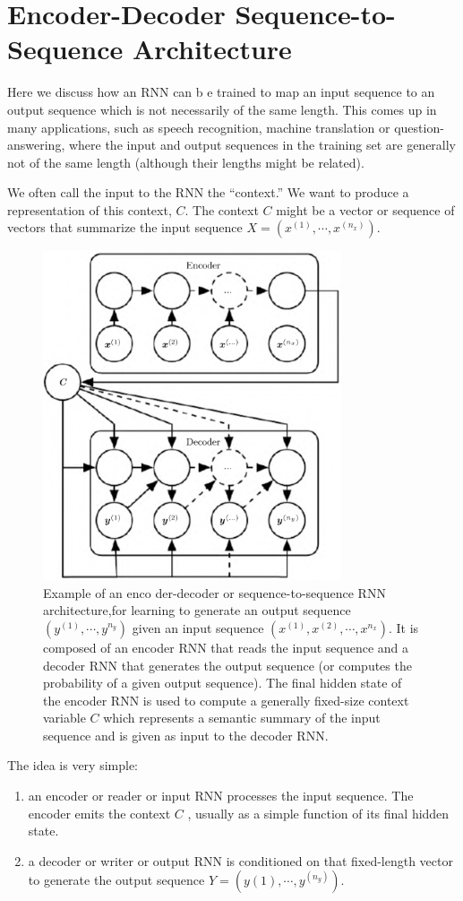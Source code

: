 \documentclass{report}
\begin{document}
\section{Encoder-Decoder Sequence-to-Sequence Architecture}
Here we discuss how an RNN can b e trained to map an input sequence to an output sequence which is not necessarily of the same length. This comes up in many applications, such as speech recognition, machine translation or question-answering, where the input and output sequences in the training set are generally not of the same length (although their lengths might be related).

We often call the input to the RNN the “context.” We want to produce a representation of this context, $C$. The context $C$ might be a vector or sequence of vectors that summarize the input sequence $X = (x^{(1)}, \cdots, x^{(n_x)})$.

\begin{figure}[ht]
	\includegraphics[width=250pt]{42}
	\centering
	\caption{Example of an enco der-decoder or sequence-to-sequence RNN architecture,for learning to generate an output sequence $(y^{(1)}, \cdots, y^{n_y})$ given an input sequence $(x^{(1)} ,x^{(2)} ,\cdots,x^{n_x})$. It is composed of an encoder RNN that reads the input sequence and a decoder RNN that generates the output sequence (or computes the probability of a  given output sequence). The final hidden state of the encoder RNN is used to compute a generally fixed-size context variable $C$ which represents a semantic summary of the input sequence and is given as input to the decoder RNN.}
\end{figure}
The idea is very simple: 
\begin{enumerate}
	\item an encoder or reader or input RNN processes the input sequence. The encoder emits the context $C$ , usually as a simple function of its final hidden state. 
	\item  a decoder or writer or output RNN is conditioned on that fixed-length vector to generate the output sequence $Y = (y{(1)}, \cdots , y^{(n_y)})$.
\end{enumerate}
\end{document}

